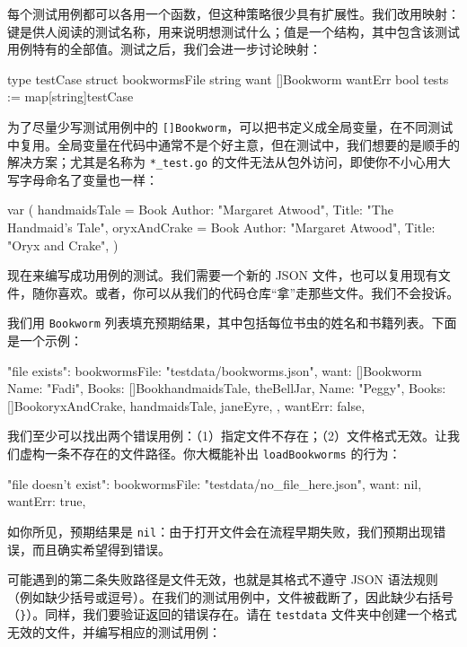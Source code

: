 每个测试用例都可以各用一个函数，但这种策略很少具有扩展性。我们改用映射：键是供人阅读的测试名称，用来说明想测试什么；值是一个结构，其中包含该测试用例特有的全部值。测试之后，我们会进一步讨论映射：

\begin{gocode}[]
type testCase struct {
    bookwormsFile string
    want          []Bookworm
    wantErr       bool
}
tests := map[string]testCase{}
\end{gocode}

为了尽量少写测试用例中的 \texttt{[]Bookworm}，可以把书定义成全局变量，在不同测试中复用。全局变量在代码中通常不是个好主意，但在测试中，我们想要的是顺手的解决方案；尤其是名称为 \texttt{*\_test.go} 的文件无法从包外访问，即使你不小心用大写字母命名了变量也一样：

\begin{gocode}[]
var (
    handmaidsTale = Book {
        Author: "Margaret Atwood", Title: "The Handmaid's Tale",
    }
    oryxAndCrake = Book {
        Author: "Margaret Atwood", Title: "Oryx and Crake",
    }
)
\end{gocode}

现在来编写成功用例的测试。我们需要一个新的 JSON 文件，也可以复用现有文件，随你喜欢。或者，你可以从我们的代码仓库“拿”走那些文件。我们不会投诉。

我们用 \texttt{Bookworm} 列表填充预期结果，其中包括每位书虫的姓名和书籍列表。下面是一个示例：

\begin{gocode}[]
"file exists": {
    bookwormsFile: "testdata/bookworms.json",
    want: []Bookworm{
        {Name: "Fadi", Books: []Book{handmaidsTale, theBellJar}},
        {Name: "Peggy", Books: []Book{oryxAndCrake, handmaidsTale,
            janeEyre}},
    },
    wantErr: false,
}
\end{gocode}

我们至少可以找出两个错误用例：（1）指定文件不存在；（2）文件格式无效。让我们虚构一条不存在的文件路径。你大概能补出 \texttt{loadBookworms} 的行为：

\begin{gocode}[]
"file doesn't exist": {
    bookwormsFile: "testdata/no_file_here.json",
    want:          nil,
    wantErr:       true,
}
\end{gocode}

如你所见，预期结果是 \texttt{nil}：由于打开文件会在流程早期失败，我们预期出现错误，而且确实希望得到错误。

可能遇到的第二条失败路径是文件无效，也就是其格式不遵守 JSON 语法规则（例如缺少括号或逗号）。在我们的测试用例中，文件被截断了，因此缺少右括号（\texttt{\}}）。同样，我们要验证返回的错误存在。请在 \texttt{testdata} 文件夹中创建一个格式无效的文件，并编写相应的测试用例：

